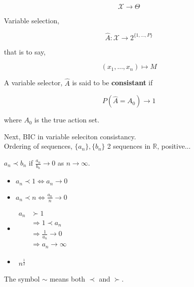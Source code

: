 \documentclass[11pt,fleqn]{book} %
\begin{document}
$$\mathscr{X} \rightarrow \Theta $$

Variable selection, 

$$\hat{A}: \mathscr{X} \rightarrow 2^{\{1, \dots, P\}}$$

that is to say, 

$$(x_1, \dots, x_n) \mapsto M $$

\begin{definition}
	A variable selector, $\hat{A}$ is said to be \textbf{consistant} if 

	$$P(\hat{A} = A_0) \rightarrow 1 $$

	where $A_0$ is the true action set. 
\end{definition}

Next, BIC in variable seleciton consistancy.\\

 Ordering of sequences, $\{a_n\}, \{b_n\}$ 2 sequences in $\mathbb{R}$, positive...

 \begin{notation}
 	$a_n \prec b_n$ if $\frac{a_n}{b_n} \rightarrow 0$ as $ n \rightarrow \infty$. 

 \begin{example}
 \begin{itemize}
 	\item $a_n \prec 1 \Leftrightarrow a_n \rightarrow 0$
 	\item $a_n \prec n \Leftrightarrow \frac{a_n}{n} \rightarrow 0$
 \end{itemize}
 	
 \end{example}


 \begin{example}
 \begin{itemize}
 	\item $\begin{aligned}
 	 		a_n &\succ 1\\
 	 			&\Rightarrow 1 \prec a_n\\
 	 			&\Rightarrow \frac{1}{a_n} \rightarrow 0\\
 	 			&\Rightarrow a_n \rightarrow \infty
 	 	\end{aligned}$
 	 \item $\begin{aligned}
 	 	n^{\frac{1}{2}}
 	 \end{aligned}$
 \end{itemize}
 	
 \end{example}

 The symbol $\sim$ means both $\prec$ and $\succ$.
 \end{notation}
\end{document}
